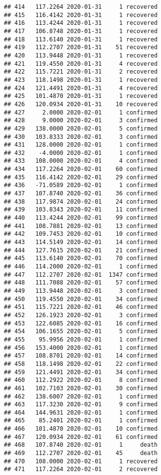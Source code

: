 \documentclass[
]{article}
\begin{document}
\begin{verbatim}
## 414   117.2264 2020-01-31     1 recovered
## 415   116.4142 2020-01-31     1 recovered
## 416   113.4244 2020-01-31     1 recovered
## 417   106.8748 2020-01-31     1 recovered
## 418   113.6140 2020-01-31     1 recovered
## 419   112.2707 2020-01-31    51 recovered
## 420   113.9448 2020-01-31     1 recovered
## 421   119.4550 2020-01-31     4 recovered
## 422   115.7221 2020-01-31     2 recovered
## 423   118.1498 2020-01-31     1 recovered
## 424   121.4491 2020-01-31     4 recovered
## 425   101.4870 2020-01-31     1 recovered
## 426   120.0934 2020-01-31    10 recovered
## 427     2.0000 2020-02-01     1 confirmed
## 428     9.0000 2020-02-01     3 confirmed
## 429   138.0000 2020-02-01     5 confirmed
## 430   103.8333 2020-02-01     3 confirmed
## 431   128.0000 2020-02-01     1 confirmed
## 432    -4.0000 2020-02-01     1 confirmed
## 433   108.0000 2020-02-01     4 confirmed
## 434   117.2264 2020-02-01    60 confirmed
## 435   116.4142 2020-02-01    29 confirmed
## 436   -71.0589 2020-02-01     1 confirmed
## 437   107.8740 2020-02-01    36 confirmed
## 438   117.9874 2020-02-01    24 confirmed
## 439   103.8343 2020-02-01    11 confirmed
## 440   113.4244 2020-02-01    99 confirmed
## 441   108.7881 2020-02-01    13 confirmed
## 442   109.7453 2020-02-01    10 confirmed
## 443   114.5149 2020-02-01    14 confirmed
## 444   127.7615 2020-02-01    21 confirmed
## 445   113.6140 2020-02-01    70 confirmed
## 446   114.2000 2020-02-01     1 confirmed
## 447   112.2707 2020-02-01  1347 confirmed
## 448   111.7088 2020-02-01    57 confirmed
## 449   113.9448 2020-02-01     3 confirmed
## 450   119.4550 2020-02-01    34 confirmed
## 451   115.7221 2020-02-01    46 confirmed
## 452   126.1923 2020-02-01     3 confirmed
## 453   122.6085 2020-02-01    16 confirmed
## 454   106.1655 2020-02-01     5 confirmed
## 455    95.9956 2020-02-01     1 confirmed
## 456   153.4000 2020-02-01     1 confirmed
## 457   108.8701 2020-02-01    14 confirmed
## 458   118.1498 2020-02-01    22 confirmed
## 459   121.4491 2020-02-01    34 confirmed
## 460   112.2922 2020-02-01     8 confirmed
## 461   102.7103 2020-02-01    30 confirmed
## 462   138.6007 2020-02-01     1 confirmed
## 463   117.3230 2020-02-01     9 confirmed
## 464   144.9631 2020-02-01     1 confirmed
## 465    85.2401 2020-02-01     1 confirmed
## 466   101.4870 2020-02-01    10 confirmed
## 467   120.0934 2020-02-01    61 confirmed
## 468   107.8740 2020-02-01     1     death
## 469   112.2707 2020-02-01    45     death
## 470   108.0000 2020-02-01     1 recovered
## 471   117.2264 2020-02-01     2 recovered

\end{verbatim}
\end{document}

